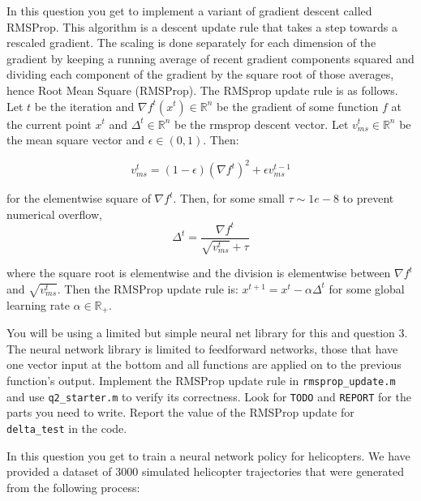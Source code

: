 \documentclass{article}
\begin{document}
In this question you get to implement a variant of gradient descent called RMSProp.
This algorithm is a descent update rule that takes a step towards a rescaled gradient.
The scaling is done separately for each dimension of the gradient by keeping a running average
of recent gradient components squared and dividing each component of the gradient by the square root of 
those averages, hence Root Mean Square (RMSProp).
The RMSprop update rule is as follows.  
Let $t$ be the iteration and $\nabla f^t(x^t) \in \mathbb{R}^n$ be the gradient of some function $f$ at the current point $x^t$ and $\Delta^t \in \mathbb{R}^n$ 
be the rmsprop descent vector.
Let $v_{ms}^t \in \mathbb{R}^n$ be the mean square vector and $\epsilon \in (0, 1)$.
Then:

\[
    v_{ms}^{t} = (1 - \epsilon) (\nabla f^t)^2 + \epsilon v_{ms}^{t - 1}
\]

for the elementwise square of $\nabla f ^t$.
Then, for some small $\tau \sim 1e-8$ to prevent numerical overflow,
\[
    \Delta^t = \frac{\nabla f^t} {\sqrt{v_{ms}^t} + \tau}
\]

where the square root is elementwise and the division is elementwise between $\nabla f^t$ and $\sqrt{v_{ms}^t}$.
Then the RMSProp update rule is:
$x^{t+1} = x^t - \alpha \Delta^t$ for some global learning rate $\alpha \in \mathbb{R}_+$.

You will be using a limited but simple neural net library for this and question 3.
The neural network library is limited to feedforward networks, those that have one vector
input at the bottom and all functions are applied on to the previous function's output.
Implement the RMSProp update rule in \verb|rmsprop_update.m| and use \verb|q2_starter.m| to verify its correctness.
Look for \verb|TODO| and \verb|REPORT| for the parts you need to write.
Report the value of the RMSProp update for \verb|delta_test| in the code.
\\




In this question you get to train a neural network policy for helicopters.
We have provided a dataset of 3000 simulated helicopter trajectories that were generated from the following process:
\\
\end{document}
